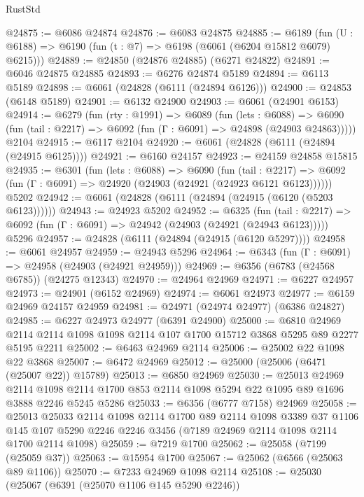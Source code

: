 \begin{lexlean}{RustStd}
\begin{coremodule}
@24875 := @6086 @24874
@24876 := @6083 @24875
@24885 := @6189
    (fun (U : @6188) => @6190 (fun (t : @7) => @6198 (@6061 (@6204 @15812 @6079) @6215)))
@24889 := @24850 (@24876 @24885) (@6271 @24822)
@24891 := @6046 @24875 @24885
@24893 := @6276 @24874 @5189
@24894 := @6113 @5189
@24898 := @6061 (@24828 (@6111 (@24894 @6126)))
@24900 := @24853 (@6148 @5189)
@24901 := @6132 @24900
@24903 := @6061 (@24901 @6153)
@24914 := @6279
    (fun (rty : @1991) =>
    @6089
      (fun (lets : @6088) =>
      @6090 (fun (tail : @2217) => @6092 (fun (Γ : @6091) => @24898 (@24903 @24863)))))
    @2104
@24915 := @6117 @2104
@24920 := @6061 (@24828 (@6111 (@24894 (@24915 @6125))))
@24921 := @6160 @24157
@24923 := @24159 @24858 @15815
@24935 := @6301
    (fun (lets : @6088) =>
    @6090
      (fun (tail : @2217) =>
      @6092 (fun (Γ : @6091) => @24920 (@24903 (@24921 (@24923 @6121 @6123))))))
    @5202
@24942 := @6061 (@24828 (@6111 (@24894 (@24915 (@6120 (@5203 @6123))))))
@24943 := @24923 @5202
@24952 := @6325
    (fun (tail : @2217) => @6092 (fun (Γ : @6091) => @24942 (@24903 (@24921 (@24943 @6123)))))
    @5296
@24957 := @24828 (@6111 (@24894 (@24915 (@6120 @5297))))
@24958 := @6061 @24957
@24959 := @24943 @5296
@24964 := @6343 (fun (Γ : @6091) => @24958 (@24903 (@24921 @24959)))
@24969 := @6356 (@6783 (@24568 @6785)) (@24275 @12343)
@24970 := @24964 @24969
@24971 := @6227 @24957
@24973 := @24901 (@6152 @24969)
@24974 := @6061 @24973
@24977 := @6159 @24969 @24157 @24959
@24981 := @24971 (@24974 @24977) (@6386 @24827)
@24985 := @6227 @24973 @24977 (@6391 @24900)
@25000 := @6810
    @24969
    @2114
    @2114
    @1098
    @1098
    @2114
    @107
    @1700
    @15712
    @3868
    @5295
    @89
    @2277
    @5195
    @2211
@25002 := @6463 @24969 @2114
@25006 := @25002 @22 @1098 @22 @3868
@25007 := @6472 @24969
@25012 := @25000 (@25006 (@6471 (@25007 @22)) @15789)
@25013 := @6850 @24969
@25030 := @25013
    @24969
    @2114
    @1098
    @2114
    @1700
    @853
    @2114
    @1098
    @5294
    @22
    @1095
    @89
    @1696
    @3888
    @2246
    @5245
    @5286
@25033 := @6356 (@6777 @7158) @24969
@25058 := @25013
    @25033
    @2114
    @1098
    @2114
    @1700
    @89
    @2114
    @1098
    @3389
    @37
    @1106
    @145
    @107
    @5290
    @2246
    @2246
    @3456
    (@7189 @24969 @2114 @1098 @2114 @1700 @2114 @1098)
@25059 := @7219 @1700
@25062 := @25058 (@7199 (@25059 @37))
@25063 := @15954 @1700
@25067 := @25062 (@6566 (@25063 @89 @1106))
@25070 := @7233 @24969 @1098 @2114
@25108 := @25030
    (@25067
      (@6391 (@25070 @1106 @145 @5290 @2246))

\end{coremodule}
\end{lexlean}
